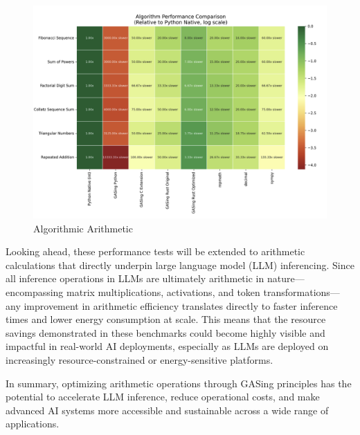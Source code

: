\begin{figure}[H]
  \centering
  \includegraphics[width=\linewidth]{images/AlgorithmPerformanceComparison.png}
  \caption{Algorithmic Arithmetic}
  \label{fig:algorithmperformancecomparison}
\end{figure}



Looking ahead, these performance tests will be extended to arithmetic calculations that directly underpin large language model (LLM) inferencing. Since all inference operations in LLMs are ultimately arithmetic in nature—encompassing matrix multiplications, activations, and token transformations—any improvement in arithmetic efficiency translates directly to faster inference times and lower energy consumption at scale. This means that the resource savings demonstrated in these benchmarks could become highly visible and impactful in real-world AI deployments, especially as LLMs are deployed on increasingly resource-constrained or energy-sensitive platforms.

In summary, optimizing arithmetic operations through GASing principles has the potential to accelerate LLM inference, reduce operational costs, and make advanced AI systems more accessible and sustainable across a wide range of applications.
